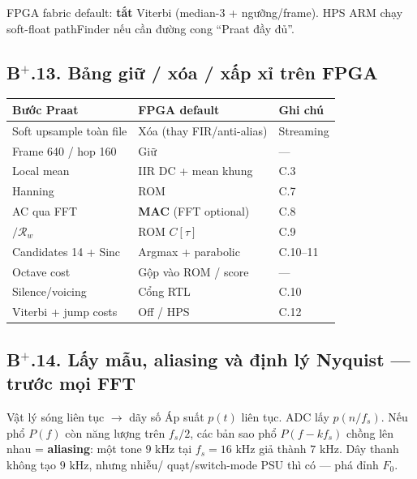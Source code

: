 \begin{costbox}
FPGA fabric default: \textbf{tắt} Viterbi (median-3 + ngưỡng/frame). HPS ARM chạy soft-float pathFinder nếu cần đường cong ``Praat đầy đủ''.
\end{costbox}

\subsection*{B$^+$.13. Bảng giữ / xóa / xấp xỉ trên FPGA}

\begin{center}\small
\begin{tabular}{@{}p{3.2cm}p{4.2cm}p{4.5cm}@{}}
\toprule
Bước Praat & FPGA default & Ghi chú \\
\midrule
Soft upsample toàn file & Xóa (thay FIR/anti-alias) & Streaming \\
Frame 640 / hop 160 & Giữ & --- \\
Local mean & IIR DC + mean khung & C.3 \\
Hanning & ROM & C.7 \\
AC qua FFT & \textbf{MAC} (FFT optional) & C.8 \\
$/ \mathcal{R}_w$ & ROM $C[\tau]$ & C.9 \\
Candidates 14 + Sinc & Argmax + parabolic & C.10--11 \\
Octave cost & Gộp vào ROM / score & --- \\
Silence/voicing & Cổng RTL & C.10 \\
Viterbi + jump costs & Off / HPS & C.12 \\
\bottomrule
\end{tabular}
\end{center}

\newpage

\subsection*{B$^+$.14. Lấy mẫu, aliasing và định lý Nyquist --- trước mọi FFT}

\begin{firstprin}{Vật lý sóng liên tục $\to$ dãy số}
Áp suất $p(t)$ liên tục. ADC lấy $p(n/f_s)$. Nếu phổ $P(f)$ còn năng lượng trên $f_s/2$, các bản sao phổ $P(f-kf_s)$ chồng lên nhau = \textbf{aliasing}: một tone $9\text{ kHz}$ tại $f_s=16\text{ kHz}$ giả thành $7\text{ kHz}$. Dây thanh không tạo $9\text{ kHz}$, nhưng nhiễu/ quạt/switch-mode PSU thì có --- phá đỉnh $F_0$.
\end{firstprin}

